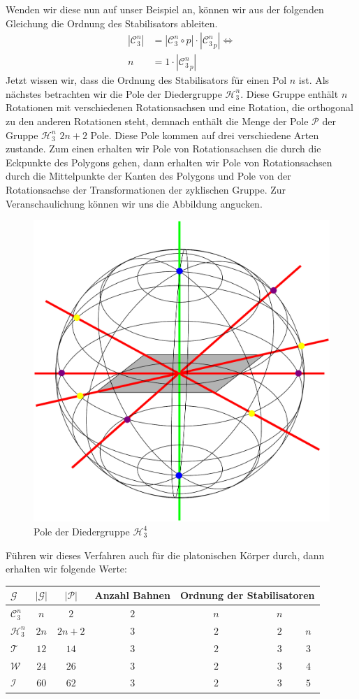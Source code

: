Wenden wir diese nun auf unser Beispiel an, können wir aus der folgenden Gleichung die Ordnung des Stabilisators ableiten.
\begin{align*}
	 |\mathcal{C}_3^n| &= |\mathcal{C}_3^n \circ p| \cdot |{\mathcal{C}_3^n}_p| \Leftrightarrow\\
	 n &= 1 \cdot |{\mathcal{C}_3^n}_p|
\end{align*}
Jetzt wissen wir, dass die Ordnung des Stabilisators für einen Pol $n$ ist. Als nächstes betrachten wir die Pole der Diedergruppe $\mathcal{H}_3^n$. Diese Gruppe enthält $n$ Rotationen mit verschiedenen Rotationsachsen und eine Rotation, die orthogonal zu den anderen Rotationen steht, demnach enthält die Menge der Pole $\mathcal{P}$ der Gruppe $\mathcal{H}_3^n$ $2n+2$ Pole. Diese Pole kommen auf drei verschiedene Arten zustande. Zum einen erhalten wir Pole von Rotationsachsen die durch die Eckpunkte des Polygons gehen, dann erhalten wir Pole von Rotationsachsen durch die Mittelpunkte der Kanten des Polygons und Pole von der Rotationsachse der Transformationen der zyklischen Gruppe. Zur Veranschaulichung können wir uns die Abbildung angucken.
\begin{figure}[H]
\centering
\includegraphics[width=0.5\linewidth]{grafiken/pole_diedergruppe}
\caption{Pole der Diedergruppe $\mathcal{H}_3^4$}
\label{fig:pole_diedergruppe}
\end{figure}
Führen wir dieses Verfahren auch für die platonischen Körper durch, dann erhalten wir folgende Werte:
\begin{center}
	\begin{tabular}{l|cccccc}
		$\mathcal{G}$ & $|\mathcal{G}|$ & $|\mathcal{P}|$ & Anzahl Bahnen & \multicolumn{3}{c}{Ordnung der Stabilisatoren}\\
		\hline
		$\mathcal{C}^n_3$ & $n$ & $2$ & $2$ & \ \ \ \ \ $n$ & \ \ \ \ \ \ $n$ & \\
		$\mathcal{H}^n_3$ & $2n$ & $2n + 2$ & $3$ & \ \ \ \ \ $2$ & \ \ \ \ \ \ $2$ & $n$\\
		$\mathcal{T}$ & $12$ & $14$ & $3$ & \ \ \ \ \ $2$ & \ \ \ \ \ \ $3$ & $3$\\
		$\mathcal{W}$ & $24$ & $26$ & $3$ & \ \ \ \ \  $2$ & \ \ \ \ \ \ $3$ & $4$\\
		$\mathcal{I}$ & $60$ & $62$ & $3$ & \ \ \ \ \ $2$ & \ \ \ \ \ \ $3$ & $5$
	\end{tabular}
\end{center}

